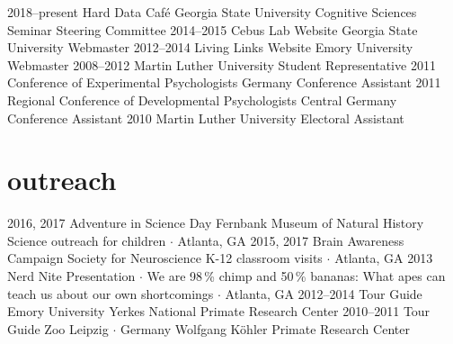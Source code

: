\documentclass[]{friggeri-cv}
\begin{document}
\begin{entrylist}
  \entry
    {2018--present}
    {Hard Data Café}
    {Georgia State University}
    {Cognitive Sciences Seminar Steering Committee}
  \entry
    {2014--2015}
    {Cebus Lab Website}
    {Georgia State University}
    {Webmaster}
  \entry
    {2012--2014}
    {Living Links Website}
    {Emory University}
    {Webmaster}
  \entry
    {2008--2012}
    {Martin Luther University}
    {}
    {Student Representative}
 \entry
   {2011}
   {Conference of Experimental Psychologists}
   {Germany}
   {Conference Assistant}
 \entry
   {2011}
   {Regional Conference of Developmental Psychologists}
   {Central Germany}
   {Conference Assistant}
 \entry
   {2010}
   {Martin Luther University}
   {}
   {Electoral Assistant}
\end{entrylist}


\section{outreach}

\begin{entrylist}
  \entry
    {2016, 2017}
    {Adventure in Science Day}
    {Fernbank Museum of Natural History}
    {Science outreach for children $\cdot$ Atlanta, GA}
  \entry
    {2015, 2017}
    {Brain Awareness Campaign}
    {Society for Neuroscience}
    {K-12 classroom visits $\cdot$ Atlanta, GA}
  \entry
    {2013}
    {Nerd Nite}
    {}
    {Presentation $\cdot$ We are 98\,\% chimp and 50\,\% bananas: What apes can teach us about our own shortcomings $\cdot$ Atlanta, GA}
  \entry
    {2012--2014}
    {Tour Guide}
    {Emory University}
    {Yerkes National Primate Research Center}
  \entry
    {2010--2011}
    {Tour Guide}
    {Zoo Leipzig $\cdot$ Germany}
    {Wolfgang K\"{o}hler Primate Research Center}
\end{entrylist}


\end{document}

